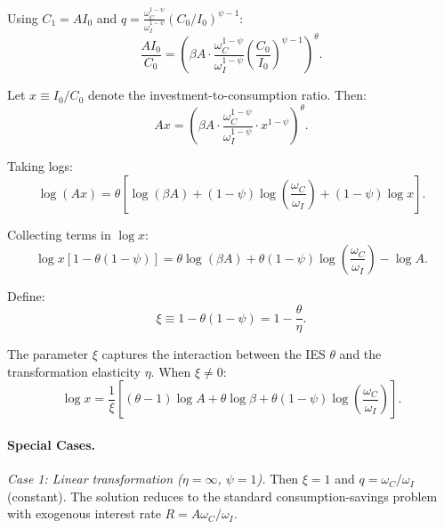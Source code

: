 Using $C_1 = A I_0$ and $q = \frac{\omega_C^{1-\psi}}{\omega_I^{1-\psi}} (C_0/I_0)^{\psi-1}$:
\begin{equation}
\frac{A I_0}{C_0} = \left( \beta A \cdot \frac{\omega_C^{1-\psi}}{\omega_I^{1-\psi}} \left( \frac{C_0}{I_0} \right)^{\psi-1} \right)^{\theta}.
\label{eq:ac-ratio-expanded}
\end{equation}

Let $x \equiv I_0 / C_0$ denote the investment-to-consumption ratio. Then:
\begin{equation}
A x = \left( \beta A \cdot \frac{\omega_C^{1-\psi}}{\omega_I^{1-\psi}} \cdot x^{1-\psi} \right)^{\theta}.
\label{eq:ac-x-equation}
\end{equation}

Taking logs:
\begin{equation}
\log(A x) = \theta \left[ \log(\beta A) + (1-\psi) \log\left( \frac{\omega_C}{\omega_I} \right) + (1-\psi) \log x \right].
\label{eq:ac-log-equation}
\end{equation}

Collecting terms in $\log x$:
\begin{equation}
\log x \left[ 1 - \theta(1-\psi) \right] = \theta \log(\beta A) + \theta(1-\psi) \log\left( \frac{\omega_C}{\omega_I} \right) - \log A.
\label{eq:ac-log-x-solve}
\end{equation}

Define:
\begin{equation}
\xi \equiv 1 - \theta(1-\psi) = 1 - \frac{\theta}{\eta}.
\label{eq:ac-xi-def}
\end{equation}

The parameter $\xi$ captures the interaction between the IES $\theta$ and the transformation elasticity $\eta$. When $\xi \neq 0$:
\begin{equation}
\log x = \frac{1}{\xi} \left[ (\theta - 1) \log A + \theta \log \beta + \theta(1-\psi) \log\left( \frac{\omega_C}{\omega_I} \right) \right].
\label{eq:ac-log-x-solution}
\end{equation}

\paragraph{Special Cases.}

\medskip
\noindent
\textit{Case 1: Linear transformation ($\eta = \infty$, $\psi = 1$).} Then $\xi = 1$ and $q = \omega_C / \omega_I$ (constant). The solution reduces to the standard consumption-savings problem with exogenous interest rate $R = A \omega_C / \omega_I$.

